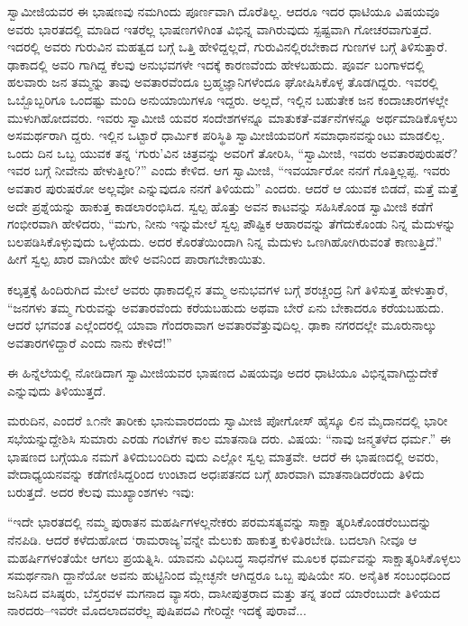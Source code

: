 ಸ್ವಾಮೀಜಿಯವರ ಈ ಭಾಷಣವು ನಮಗಿಂದು ಪೂರ್ಣವಾಗಿ ದೊರೆತಿಲ್ಲ. ಆದರೂ ಇದರ ಧಾಟಿಯೂ ವಿಷಯವೂ ಅವರು ಭಾರತದಲ್ಲಿ ಮಾಡಿದ ಇತರೆಲ್ಲ ಭಾಷಣಗಳಿಗಿಂತ ವಿಭಿನ್ನ ವಾಗಿರುವುದು ಸ್ಪಷ್ಟವಾಗಿ ಗೋಚರವಾಗುತ್ತದೆ. ಇದರಲ್ಲಿ ಅವರು ಗುರುವಿನ ಮಹತ್ವದ ಬಗ್ಗೆ ಒತ್ತಿ ಹೇಳಿದ್ದಲ್ಲದೆ, ಗುರುವಿನಲ್ಲಿರಬೇಕಾದ ಗುಣಗಳ ಬಗ್ಗೆ ತಿಳಿಸುತ್ತಾರೆ. ಢಾಕಾದಲ್ಲಿ ಅವರಿ ಗಾಗಿದ್ದ ಕೆಲವು ಅನುಭವಗಳೇ ಇದಕ್ಕೆ ಕಾರಣವೆಂದು ಹೇಳಬಹುದು. ಪೂರ್ವ ಬಂಗಾಳದಲ್ಲಿ ಹಲವಾರು ಜನ ತಮ್ಮನ್ನು ತಾವು ಅವತಾರವೆಂದೂ ಬ್ರಹ್ಮಜ್ಞಾನಿಗಳೆಂದೂ ಘೋಷಿಸಿಕೊಳ್ಳ ತೊಡಗಿದ್ದರು. ಇವರಲ್ಲಿ ಒಬ್ಬೊಬ್ಬರಿಗೂ ಒಂದಷ್ಟು ಮಂದಿ ಅನುಯಾಯಿಗಳೂ ಇದ್ದರು. ಅಲ್ಲದೆ, ಇಲ್ಲಿನ ಬಹುತೇಕ ಜನ ಕಂದಾಚಾರಗಳಲ್ಲೇ ಮುಳುಗಿಹೋದವರು. ಇವರು ಸ್ವಾಮೀಜಿ ಯವರ ಸಂದೇಶಗಳನ್ನೂ ಮಾತುಕತೆ-ವರ್ತನೆಗಳನ್ನೂ ಅರ್ಥಮಾಡಿಕೊಳ್ಳಲು ಅಸಮರ್ಥರಾಗಿ ದ್ದರು. ಇಲ್ಲಿನ ಒಟ್ಟಾರೆ ಧಾರ್ಮಿಕ ಪರಿಸ್ಥಿತಿ ಸ್ವಾಮೀಜಿಯವರಿಗೆ ಸಮಾಧಾನವನ್ನುಂಟು ಮಾಡಲಿಲ್ಲ. ಒಂದು ದಿನ ಒಬ್ಬ ಯುವಕ ತನ್ನ ‘ಗುರು’ವಿನ ಚಿತ್ರವನ್ನು ಅವರಿಗೆ ತೋರಿಸಿ, “ಸ್ವಾಮೀಜಿ, ಇವರು ಅವತಾರಪುರುಷರೆ? ಇವರ ಬಗ್ಗೆ ನೀವೇನು ಹೇಳುತ್ತೀರಿ?” ಎಂದು ಕೇಳಿದ. ಆಗ ಸ್ವಾಮೀಜಿ, “ಇವರ್ಯಾರೋ ನನಗೆ ಗೊತ್ತಿಲ್ಲಪ್ಪ. ಇವರು ಅವತಾರ ಪುರುಷರೋ ಅಲ್ಲವೋ ಎನ್ನುವುದೂ ನನಗೆ ತಿಳಿಯದು” ಎಂದರು. ಆದರೆ ಆ ಯುವಕ ಬಿಡದೆ, ಮತ್ತೆ ಮತ್ತೆ ಅದೇ ಪ್ರಶ್ನೆಯನ್ನು ಹಾಕುತ್ತ ಕಾಡಲಾರಂಭಿಸಿದ. ಸ್ವಲ್ಪ ಹೊತ್ತು ಅವನ ಕಾಟವನ್ನು ಸಹಿಸಿಕೊಂಡ ಸ್ವಾಮೀಜಿ ಕಡೆಗೆ ಗಂಭೀರವಾಗಿ ಹೇಳಿದರು, “ಮಗು, ನೀನು ಇನ್ನುಮೇಲೆ ಸ್ವಲ್ಪ ಪೌಷ್ಟಿಕ ಆಹಾರವನ್ನು ತೆಗೆದುಕೊಂಡು ನಿನ್ನ ಮೆದುಳನ್ನು ಬಲಪಡಿಸಿಕೊಳ್ಳುವುದು ಒಳ್ಳೆಯದು. ಅದರ ಕೊರತೆಯಿಂದಾಗಿ ನಿನ್ನ ಮೆದುಳು ಒಣಗಿಹೋಗಿರುವಂತೆ ಕಾಣುತ್ತಿದೆ.” ಹೀಗೆ ಸ್ವಲ್ಪ ಖಾರ ವಾಗಿಯೇ ಹೇಳಿ ಅವನಿಂದ ಪಾರಾಗಬೇಕಾಯಿತು.

ಕಲ್ಕತ್ತಕ್ಕೆ ಹಿಂದಿರುಗಿದ ಮೇಲೆ ಅವರು ಢಾಕಾದಲ್ಲಿನ ತಮ್ಮ ಅನುಭವಗಳ ಬಗ್ಗೆ ಶರಚ್ಚಂದ್ರ ನಿಗೆ ತಿಳಿಸುತ್ತ ಹೇಳುತ್ತಾರೆ, “ಜನಗಳು ತಮ್ಮ ಗುರುವನ್ನು ಅವತಾರವೆಂದು ಕರೆಯಬಹುದು ಅಥವಾ ಬೇರೆ ಏನು ಬೇಕಾದರೂ ಕರೆಯಬಹುದು. ಆದರೆ ಭಗವಂತ ಎಲ್ಲೆಂದರಲ್ಲಿ ಯಾವಾ ಗೆಂದರಾವಾಗ ಅವತಾರವೆತ್ತುವುದಿಲ್ಲ. ಢಾಕಾ ನಗರದಲ್ಲೇ ಮೂರುನಾಲ್ಕು ಅವತಾರಗಳಿದ್ದಾರೆ ಎಂದು ನಾನು ಕೇಳಿದೆ!”

ಈ ಹಿನ್ನೆಲೆಯಲ್ಲಿ ನೋಡಿದಾಗ ಸ್ವಾಮೀಜಿಯವರ ಭಾಷಣದ ವಿಷಯವೂ ಅದರ ಧಾಟಿಯೂ ವಿಭಿನ್ನವಾಗಿದ್ದುದೇಕೆ ಎನ್ನುವುದು ತಿಳಿಯುತ್ತದೆ.

ಮರುದಿನ, ಎಂದರೆ ೩೧ನೇ ತಾರೀಕು ಭಾನುವಾರದಂದು ಸ್ವಾಮೀಜಿ ಪೋಗೋಸ್ ಹೈಸ್ಕೂ ಲಿನ ಮೈದಾನದಲ್ಲಿ ಭಾರೀ ಸಭೆಯನ್ನುದ್ದೇಶಿಸಿ ಸುಮಾರು ಎರಡು ಗಂಟೆಗಳ ಕಾಲ ಮಾತನಾಡಿ ದರು. ವಿಷಯ: “ನಾವು ಜನ್ಮತಳೆದ ಧರ್ಮ.” ಈ ಭಾಷಣದ ಬಗ್ಗೆಯೂ ನಮಗೆ ತಿಳಿದುಬಂದಿರು ವುದು ಎಲ್ಲೋ ಸ್ವಲ್ಪ ಮಾತ್ರವೇ. ಆದರೆ ಈ ಭಾಷಣದಲ್ಲಿ ಅವರು, ವೇದಾಧ್ಯಯನವನ್ನು ಕಡೆಗಣಿಸಿದ್ದರಿಂದ ಉಂಟಾದ ಅಧಃಪತನದ ಬಗ್ಗೆ ಖಾರವಾಗಿ ಮಾತನಾಡಿದರೆಂದು ತಿಳಿದು ಬರುತ್ತದೆ. ಅದರ ಕೆಲವು ಮುಖ್ಯಾಂಶಗಳು ಇವು:

“ಇದೇ ಭಾರತದಲ್ಲಿ ನಮ್ಮ ಪುರಾತನ ಮಹರ್ಷಿಗಳಲ್ಲನೇಕರು ಪರಮಸತ್ಯವನ್ನು ಸಾಕ್ಷಾ ತ್ಕರಿಸಿಕೊಂಡರೆಂಬುದನ್ನು ನೆನಪಿಡಿ. ಆದರೆ ಕಳೆದುಹೋದ ‘ರಾಮರಾಜ್ಯ’ವನ್ನೇ ಮೆಲುಕು ಹಾಕುತ್ತ ಕುಳಿತಿರಬೇಡಿ. ಬದಲಾಗಿ ನೀವೂ ಆ ಮಹರ್ಷಿಗಳಂತೆಯೇ ಆಗಲು ಪ್ರಯತ್ನಿಸಿ. ಯಾವನು ವಿಧಿಬದ್ಧ ಸಾಧನೆಗಳ ಮೂಲಕ ಧರ್ಮವನ್ನು ಸಾಕ್ಷಾತ್ಕರಿಸಿಕೊಳ್ಳಲು ಸಮರ್ಥನಾಗಿ ದ್ದಾನೆಯೋ ಅವನು ಹುಟ್ಟಿನಿಂದ ಮ್ಲೇಚ್ಛನೇ ಆಗಿದ್ದರೂ ಒಬ್ಬ ಪುಷಿಯೇ ಸರಿ. ಅನೈತಿಕ ಸಂಬಂಧದಿಂದ ಜನಿಸಿದ ವಸಿಷ್ಠರು, ಬೆಸ್ತರವಳ ಮಗನಾದ ವ್ಯಾಸರು, ದಾಸೀಪುತ್ರರಾದ ಮತ್ತು ತನ್ನ ತಂದೆ ಯಾರೆಂಬುದೇ ತಿಳಿಯದ ನಾರದರು–ಇವರೇ ಮೊದಲಾದವರೆಲ್ಲ ಪುಷಿಪದವಿ ಗೇರಿದ್ದೇ ಇದಕ್ಕೆ ಪುರಾವೆ... 

